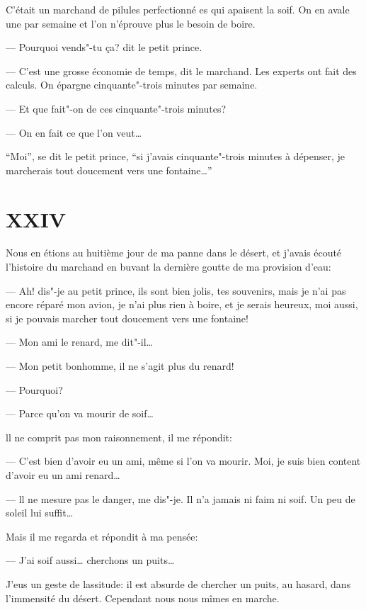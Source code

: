 C'était un marchand de pilules perfectionné es qui apaisent la soif. On en avale une
par semaine et l'on n'éprouve plus le besoin de boire.

--- Pourquoi vends"-tu ça? dit le petit prince.

--- C'est une grosse économie de temps, dit le marchand. Les experts ont fait des
calculs. On épargne cinquante"-trois minutes par semaine.

--- Et que fait"-on de ces cinquante"-trois minutes?

--- On en fait ce que l'on veut\ldots{}

``Moi'', se dit le petit prince, ``si j'avais cinquante"-trois minutes à dépenser, je
marcherais tout doucement vers une fontaine\ldots{}''

\section{XXIV}

Nous en étions au huitième jour de ma panne dans le désert, et j'avais écouté
l'histoire du marchand en buvant la dernière goutte de ma provision d'eau:

--- Ah! dis"-je au petit prince, ils sont bien jolis, tes souvenirs, mais je n'ai
pas encore réparé mon avion, je n'ai plus rien à boire, et je serais heureux, moi
aussi, si je pouvais marcher tout doucement vers une fontaine!

--- Mon ami le renard, me dit"-il\ldots{}

--- Mon petit bonhomme, il ne s'agit plus du renard!

--- Pourquoi?

--- Parce qu'on va mourir de soif\ldots{}

ll ne comprit pas mon raisonnement, il me répondit:

--- C'est bien d'avoir eu un ami, même si l'on va mourir. Moi, je suis bien content
d'avoir eu un ami renard\ldots{}

--- ll ne mesure pas le danger, me dis"-je. Il n'a jamais ni faim ni soif. Un peu
de soleil lui suffit\ldots{}

Mais il me regarda et répondit à ma pensée:

--- J'ai soif aussi\ldots{} cherchons un puits\ldots{}

J'eus un geste de lassitude: il est absurde de chercher un puits, au hasard, dans
l'immensité du désert. Cependant nous nous mîmes en marche.

\medskip


